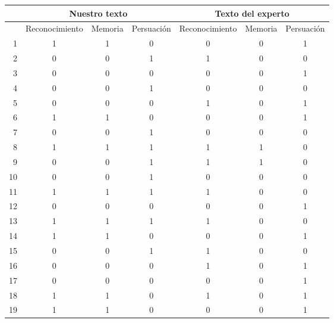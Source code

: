 \begin{table}
\centering
\tiny
\begin{tabular}{|r|c|c|c|c|c|c|}
   & \multicolumn{3}{c|}{Nuestro texto}     & \multicolumn{3}{c|}{Texto del experto}   \\\hline
   & Reconocimiento & Memoria & Persuación & Reconocimiento & Memoria & Persuación \\\hline \hline

1 &         1 &         1 &         0 &         0 &         0 &         1 \\
2 &         0 &         0 &         1 &         1 &         0 &         0 \\
3 &         0 &         0 &         0 &         0 &         0 &         1 \\
4 &         0 &         0 &         1 &         0 &         0 &         0 \\
5 &         0 &         0 &         0 &         1 &         0 &         1 \\
6 &         1 &         1 &         0 &         0 &         0 &         1 \\
7 &         0 &         0 &         1 &         0 &         0 &         0 \\
8 &         1 &         1 &         1 &         1 &         1 &         0 \\
9 &         0 &         0 &         1 &         1 &         1 &         0 \\
10 &         0 &         0 &         1 &         0 &         0 &         0 \\
11 &         1 &         1 &         1 &         1 &         0 &         0 \\
12 &         0 &         0 &         0 &         0 &         0 &         1 \\
13 &         1 &         1 &         1 &         1 &         0 &         0 \\
14 &         1 &         1 &         0 &         0 &         0 &         1 \\
15 &         0 &         0 &         1 &         1 &         0 &         0 \\
16 &         0 &         0 &         0 &         1 &         0 &         1 \\
17 &         0 &         0 &         0 &         0 &         0 &         1 \\
18 &         1 &         1 &         0 &         1 &         0 &         1 \\
19 &         1 &         1 &         0 &         0 &         0 &         1 \\

\end{tabular}
\end{table}
